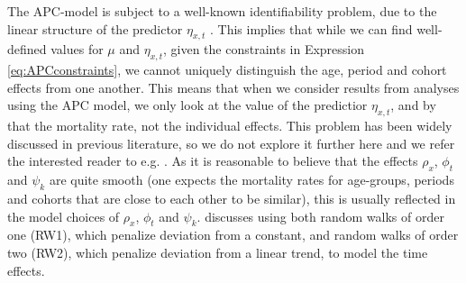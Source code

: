 \newpar The APC-model is subject to a well-known identifiability problem, due to the linear structure of the predictor $\eta_{x,t}$ \parencite{RieblerThesis2010}. This implies that while we can find well-defined values for $\mu$ and $\eta_{x,t}$, given the constraints in Expression \ref{eq:APCconstraints}, we cannot uniquely distinguish the age, period and cohort effects from one another. This means that when we consider results from analyses using the APC model, we only look at the value of the predictior $\eta_{x,t}$, and by that the mortality rate, not the individual effects. This problem has been widely discussed in previous literature, so we do not explore it further here and we refer the interested reader to e.g. \textcite{RieblerThesis2010}. 
\newpar As it is reasonable to believe that the effects $\rho_x$, $\phi_t$ and $\psi_k$ are quite smooth (one expects the mortality rates for age-groups, periods and cohorts that are close to each other to be similar), this is usually reflected in the model choices of $\rho_x$, $\phi_t$ and $\psi_k$. \textcite{RieblerThesis2010} discusses using both random walks of order one (RW1), which penalize deviation from a constant, and random walks of order two (RW2), which penalize deviation from a linear trend, to model the time effects.


